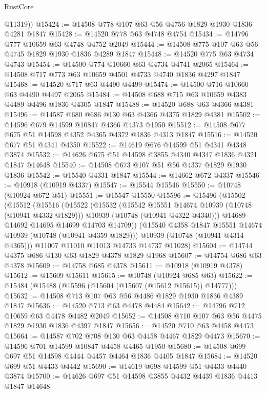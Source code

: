 \begin{lexlean}{RustCore}
\begin{coremodule}
        @11319))
@15424 := @14508 @778 @107 @63 @56 @4756 @1829 @1930 @1836 @4281 @1847
@15428 := @14520 @778 @63 @4748 @4754
@15434 := @14796 @777 @10659 @63 @4748 @4752 @2049
@15444 := @14508 @775 @107 @63 @56 @4745 @1829 @1930 @1836 @4289 @1847
@15448 := @14520 @775 @63 @4734 @4743
@15454 := @14500 @774 @10660 @63 @4734 @4741 @2065
@15464 := @14508 @717 @773 @63 @10659 @4501 @4733 @4740 @1836 @4297 @1847
@15468 := @14520 @717 @63 @4490 @4499
@15474 := @14500 @716 @10660 @63 @4490 @4497 @2065
@15484 := @14508 @688 @715 @63 @10659 @4383 @4489 @4496 @1836 @4305 @1847
@15488 := @14520 @688 @63 @4366 @4381
@15496 := @14587 @680 @686 @130 @63 @4366 @4375 @1829 @4381
@15502 := @14596 @679 @14599 @10847 @4366 @4373 @1950
@15512 := @14508 @677 @675 @51 @14598 @4352 @4365 @4372 @1836 @4313 @1847
@15516 := @14520 @677 @51 @4341 @4350
@15522 := @14619 @676 @14599 @51 @4341 @4348 @3874
@15532 := @14626 @675 @51 @14598 @3855 @4340 @4347 @1836 @4321 @1847 @14648
@15540 := @14508 @673 @107 @51 @56 @4337 @1829 @1930 @1836
@15542 := @15540 @4331 @1847
@15544 := @14662 @672 @4337
@15546 := @10918 (@10919 @4337)
@15547 := @15544 @15546
@15550 := @10748 (@10924 @672 @51)
@15551 := @15547 @15550
@15596 := @15496
    (@15502
      (@15512
        (@15516
          (@15522
            (@15532
              (@15542 @15551 @14674 @10939 (@10748 (@10941 @4332 @1829)))
              @10939
              (@10748 (@10941 @4322 @4340)))
            @14689
            @14692
            @14695
            @14699
            @14703
            @14709))
        (@15540 @4358 @1847 @15551 @14674 @10939 (@10748 (@10941 @4359 @1829)))
        @10939
        (@10748 (@10941 @4314 @4365)))
      @11007
      @11010
      @11013
      @14733
      @14737
      @11028)
@15604 := @14744 @4375 @686 @130 @63 @1829 @4378 @1829 @1968
@15607 := @14754 @686 @63 @4378
@15609 := @14758 @685 @4378
@15611 := @10918 (@10919 @4378)
@15612 := @15609 @15611
@15615 := @10748 (@10924 @685 @63)
@15622 := @15484 (@15488 (@15596 (@15604 (@15607 (@15612 @15615)) @14777)))
@15632 := @14508 @713 @107 @63 @56 @4486 @1829 @1930 @1836 @4389 @1847
@15636 := @14520 @713 @63 @4478 @4484
@15642 := @14796 @712 @10659 @63 @4478 @4482 @2049
@15652 := @14508 @710 @107 @63 @56 @4475 @1829 @1930 @1836 @4397 @1847
@15656 := @14520 @710 @63 @4458 @4473
@15664 := @14587 @702 @708 @130 @63 @4458 @4467 @1829 @4473
@15670 := @14596 @701 @14599 @10847 @4458 @4465 @1950
@15680 := @14508 @699 @697 @51 @14598 @4444 @4457 @4464 @1836 @4405 @1847
@15684 := @14520 @699 @51 @4433 @4442
@15690 := @14619 @698 @14599 @51 @4433 @4440 @3874
@15700 := @14626 @697 @51 @14598 @3855 @4432 @4439 @1836 @4413 @1847 @14648

\end{coremodule}
\end{lexlean}
